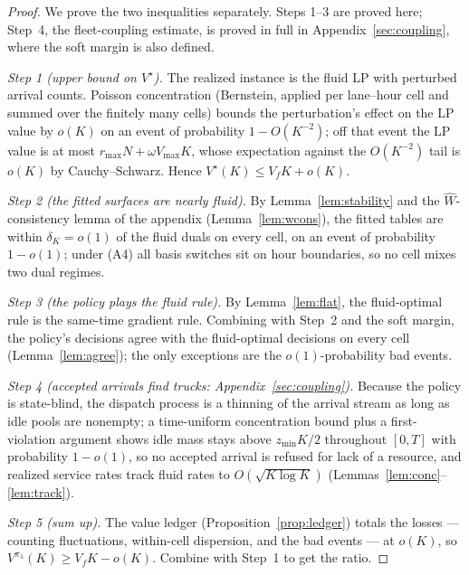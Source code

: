 \documentclass[11pt]{article}
\newcommand{\Vstar}{V^{\star}}
\newcommand{\pol}{\pi_{\lambda}}
\begin{document}
\begin{proof}
We prove the two inequalities separately. Steps 1--3 are proved here;
Step~4, the fleet-coupling estimate, is proved in full in
Appendix~\ref{sec:coupling}, where the soft margin is also defined.

\emph{Step 1 (upper bound on $\Vstar$).} The realized instance is the
fluid LP with perturbed arrival counts. Poisson concentration
(Bernstein, applied per lane--hour cell and summed over the finitely
many cells) bounds the perturbation's effect on the LP value by
$o(K)$ on an event of probability $1 - O(K^{-2})$; off that event the
LP value is at most $r_{\max} N + \omega V_{\max} K$, whose
expectation against the $O(K^{-2})$ tail is $o(K)$ by
Cauchy--Schwarz. Hence $\Vstar(K) \leq V_f K + o(K)$.

\emph{Step 2 (the fitted surfaces are nearly fluid).} By
Lemma~\ref{lem:stability} and the $\widehat{W}$-consistency lemma of
the appendix (Lemma~\ref{lem:wcons}), the fitted tables are within
$\delta_K = o(1)$ of the fluid duals on every cell, on an event of
probability $1 - o(1)$; under (A4) all basis switches sit on hour
boundaries, so no cell mixes two dual regimes.

\emph{Step 3 (the policy plays the fluid rule).} By
Lemma~\ref{lem:flat}, the fluid-optimal rule is the same-time gradient
rule. Combining with Step~2 and the soft margin, the policy's
decisions agree with the fluid-optimal decisions on every cell
(Lemma~\ref{lem:agree}); the only exceptions are the
$o(1)$-probability bad events.

\emph{Step 4 (accepted arrivals find trucks:
Appendix~\ref{sec:coupling}).} Because the policy is state-blind, the
dispatch process is a thinning of the arrival stream as long as idle
pools are nonempty; a time-uniform concentration bound plus a
first-violation argument shows idle mass stays above
$z_{\min} K/2$ throughout $[0, T]$ with probability $1 - o(1)$, so no
accepted arrival is refused for lack of a resource, and realized
service rates track fluid rates to $O(\sqrt{K \log K})$
(Lemmas~\ref{lem:conc}--\ref{lem:track}).

\emph{Step 5 (sum up).} The value ledger
(Proposition~\ref{prop:ledger}) totals the losses --- counting
fluctuations, within-cell dispersion, and the bad events --- at
$o(K)$, so $V^{\pol}(K) \geq V_f K - o(K)$. Combine with Step~1 to
get the ratio.
\end{proof}
\end{document}

